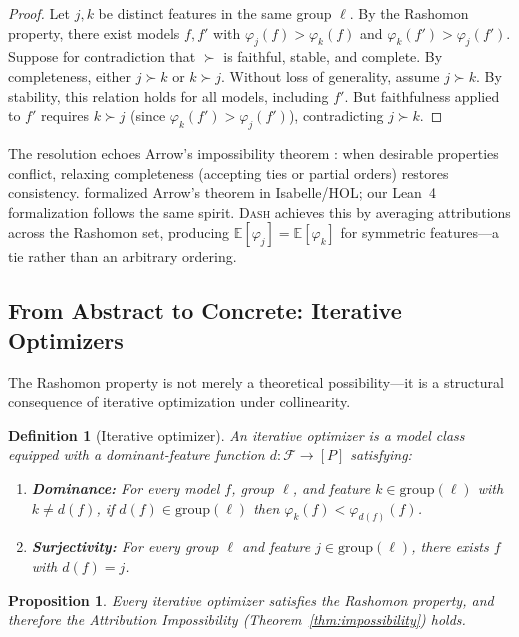 \documentclass{article}
\newtheorem{definition}[theorem]{Definition}
\newtheorem{proposition}[theorem]{Proposition}
\newcommand{\E}{\mathbb{E}}
\newcommand{\DASH}{\textsc{Dash}}
\begin{document}
\begin{proof}
Let $j, k$ be distinct features in the same group $\ell$.
By the Rashomon property, there exist models $f, f'$ with $\varphi_j(f) > \varphi_k(f)$ and $\varphi_k(f') > \varphi_j(f')$.
Suppose for contradiction that $\succ$ is faithful, stable, and complete.
By completeness, either $j \succ k$ or $k \succ j$.
Without loss of generality, assume $j \succ k$.
By stability, this relation holds for all models, including $f'$.
But faithfulness applied to $f'$ requires $k \succ j$ (since $\varphi_k(f') > \varphi_j(f')$), contradicting $j \succ k$.
\end{proof}

The resolution echoes Arrow's impossibility theorem \citep{arrow1951social}: when desirable properties conflict, relaxing completeness (accepting ties or partial orders) restores consistency. \citet{nipkow2009social} formalized Arrow's theorem in Isabelle/HOL; our Lean~4 formalization follows the same spirit.
\DASH{} achieves this by averaging attributions across the Rashomon set, producing $\E[\varphi_j] = \E[\varphi_k]$ for symmetric features---a tie rather than an arbitrary ordering.

\subsection{From Abstract to Concrete: Iterative Optimizers}
\label{sec:iterative}

The Rashomon property is not merely a theoretical possibility---it is a structural consequence of iterative optimization under collinearity.

\begin{definition}[Iterative optimizer]
\label{def:iterative}
An \emph{iterative optimizer} is a model class equipped with a dominant-feature function $d\colon \mathcal{F} \to [P]$ satisfying:
\begin{enumerate}
    \item \textbf{Dominance:} For every model $f$, group $\ell$, and feature $k \in \text{group}(\ell)$ with $k \neq d(f)$, if $d(f) \in \text{group}(\ell)$ then $\varphi_k(f) < \varphi_{d(f)}(f)$.
    \item \textbf{Surjectivity:} For every group $\ell$ and feature $j \in \text{group}(\ell)$, there exists $f$ with $d(f) = j$.
\end{enumerate}
\end{definition}

\begin{proposition}
\label{prop:iterative-rashomon}
Every iterative optimizer satisfies the Rashomon property, and therefore the Attribution Impossibility (Theorem~\ref{thm:impossibility}) holds.
\end{proposition}
\end{document}
